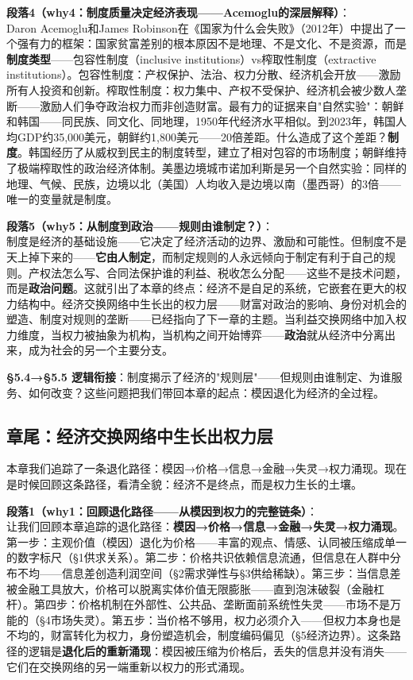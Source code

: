 \documentclass[../main.tex]{subfiles}
\begin{document}
{	\textbf{段落4（why4：制度质量决定经济表现——Acemoglu的深层解释）}：\\
	Daron Acemoglu和James Robinson在《国家为什么会失败》（2012年）中提出了一个强有力的框架：国家贫富差别的根本原因不是地理、不是文化、不是资源，而是\textbf{制度类型}——包容性制度（inclusive institutions）vs榨取性制度（extractive institutions）。包容性制度：产权保护、法治、权力分散、经济机会开放——激励所有人投资和创新。榨取性制度：权力集中、产权不受保护、经济机会被少数人垄断——激励人们争夺政治权力而非创造财富。最有力的证据来自"自然实验"：朝鲜和韩国——同民族、同文化、同地理，1950年代经济水平相似。到2023年，韩国人均GDP约35,000美元，朝鲜约1,800美元——20倍差距。什么造成了这个差距？\textbf{制度}。韩国经历了从威权到民主的制度转型，建立了相对包容的市场制度；朝鲜维持了极端榨取性的政治经济体制。美墨边境城市诺加利斯是另一个自然实验：同样的地理、气候、民族，边境以北（美国）人均收入是边境以南（墨西哥）的3倍——唯一的变量就是制度。

	\textbf{段落5（why5：从制度到政治——规则由谁制定？）}：\\
	制度是经济的基础设施——它决定了经济活动的边界、激励和可能性。但制度不是天上掉下来的——\textbf{它由人制定}，而制定规则的人永远倾向于制定有利于自己的规则。产权法怎么写、合同法保护谁的利益、税收怎么分配——这些不是技术问题，而是\textbf{政治问题}。这就引出了本章的终点：经济不是自足的系统，它嵌套在更大的权力结构中。经济交换网络中生长出的权力层——财富对政治的影响、身份对机会的塑造、制度对规则的垄断——已经指向了下一章的主题。当利益交换网络中加入权力维度，当权力被抽象为机构，当机构之间开始博弈——\textbf{政治}就从经济中分离出来，成为社会的另一个主要分支。

	\textbf{§5.4→§5.5 逻辑衔接}：制度揭示了经济的"规则层"——但规则由谁制定、为谁服务、如何改变？这些问题把我们带回本章的起点：模因退化为经济的全过程。

	\subsection{章尾：经济交换网络中生长出权力层}
	\begin{motivation}
		本章我们追踪了一条退化路径：模因→价格→信息→金融→失灵→权力涌现。现在是时候回顾这条路径，看清全貌：经济不是终点，而是权力生长的土壤。
	\end{motivation}

	\textbf{段落1（why1：回顾退化路径——从模因到权力的完整链条）}：\\
	让我们回顾本章追踪的退化路径：\textbf{模因→价格→信息→金融→失灵→权力涌现}。第一步：主观价值（模因）退化为价格——丰富的观点、情感、认同被压缩成单一的数字标尺（§1供求关系）。第二步：价格共识依赖信息流通，但信息在人群中分布不均——信息差创造利润空间（§2需求弹性与§3供给稀缺）。第三步：当信息差被金融工具放大，价格可以脱离实体价值无限膨胀——直到泡沫破裂（金融杠杆）。第四步：价格机制在外部性、公共品、垄断面前系统性失灵——市场不是万能的（§4市场失灵）。第五步：当价格不够用，权力必须介入——但权力本身也是不均的，财富转化为权力，身份塑造机会，制度编码偏见（§5经济边界）。这条路径的逻辑是\textbf{退化后的重新涌现}：模因被压缩为价格后，丢失的信息并没有消失——它们在交换网络的另一端重新以权力的形式涌现。

}
\end{document}
